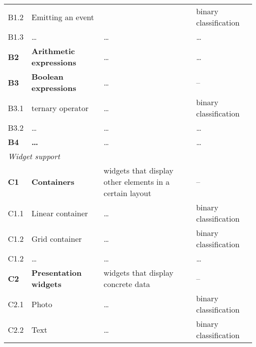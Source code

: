\begin{table}[]
\begin{tabular}{@{}llll@{}}
        B1.2            & Emitting an event               &                                                         & binary classification         \\
        B1.3            & \ldots                          & \ldots                                                  & \ldots                        \\
        \textbf{B2}     & \textbf{Arithmetic expressions} & \ldots                                                  & \ldots                        \\
        \textbf{B3}     & \textbf{Boolean expressions}    & \ldots                                                  & –                             \\
        B3.1            & ternary operator                & \ldots                                                  & binary classification         \\
        B3.2            & \ldots                          & \ldots                                                  & \ldots                        \\
        \textbf{B4}     & \textbf{\ldots}                 & \ldots                                                  & \ldots                        \\ \midrule
        \multicolumn{4}{l}{\textit{Widget support}} \\ \midrule
        \textbf{C1}     & \textbf{Containers}             & widgets that display other elements in a certain layout & –                             \\
        C1.1            & Linear container                & \ldots                                                  & binary classification         \\
        C1.2            & Grid container                  & \ldots                                                  & binary classification         \\
        C1.2            & \ldots                          & \ldots                                                  & \ldots                        \\
        \textbf{C2}     & \textbf{Presentation widgets}   & widgets that display concrete data                      & –                             \\
        C2.1            & Photo                           & \ldots                                                  & binary classification         \\
        C2.2            & Text                            & \ldots                                                  & binary classification         \\

\end{tabular}
\end{table}
